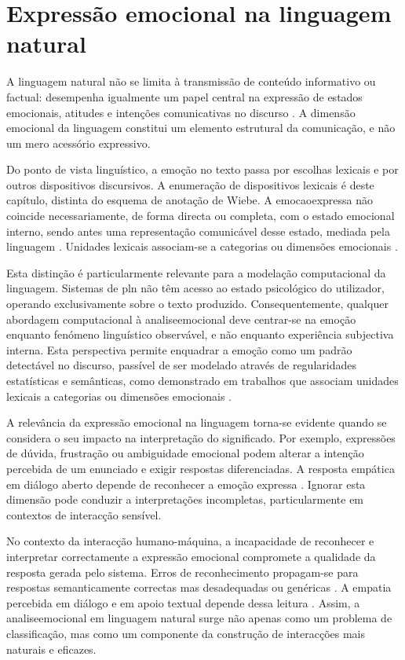 \section{Expressão emocional na linguagem natural}
\label{sec:expressao_emocional}

A linguagem natural não se limita à transmissão de conteúdo informativo ou factual: desempenha igualmente um papel central na expressão de estados emocionais, atitudes e intenções comunicativas no discurso \parencite{Wiebe2005Opinions}. A dimensão emocional da linguagem constitui um elemento estrutural da comunicação, e não um mero acessório expressivo.

Do ponto de vista linguístico, a emoção no texto passa por escolhas lexicais e por outros dispositivos discursivos. A enumeração de dispositivos lexicais é deste capítulo, distinta do esquema de anotação de Wiebe. A \gls{emocaoexpressa} não coincide necessariamente, de forma directa ou completa, com o estado emocional interno, sendo antes uma representação comunicável desse estado, mediada pela linguagem \parencite{Wiebe2005Opinions}. Unidades lexicais associam-se a categorias ou dimensões emocionais \parencite{MohammadTurney2013Lexicon}.

Esta distinção é particularmente relevante para a modelação computacional da linguagem. Sistemas de \gls{pln} não têm acesso ao estado psicológico do utilizador, operando exclusivamente sobre o texto produzido. Consequentemente, qualquer abordagem computacional à \gls{analiseemocional} deve centrar-se na emoção enquanto fenómeno linguístico observável, e não enquanto experiência subjectiva interna. Esta perspectiva permite enquadrar a emoção como um padrão detectável no discurso, passível de ser modelado através de regularidades estatísticas e semânticas, como demonstrado em trabalhos que associam unidades lexicais a categorias ou dimensões emocionais \parencite{MohammadTurney2013Lexicon}.

A relevância da expressão emocional na linguagem torna-se evidente quando se considera o seu impacto na interpretação do significado. Por exemplo, expressões de dúvida, frustração ou ambiguidade emocional podem alterar a intenção percebida de um enunciado e exigir respostas diferenciadas. A resposta empática em diálogo aberto depende de reconhecer a emoção expressa \parencite{Rashkin2019Empathy}. Ignorar esta dimensão pode conduzir a interpretações incompletas, particularmente em contextos de interacção sensível.

No contexto da interacção humano-máquina, a incapacidade de reconhecer e interpretar correctamente a expressão emocional compromete a qualidade da resposta gerada pelo sistema. Erros de reconhecimento propagam-se para respostas semanticamente correctas mas desadequadas ou genéricas \parencite{Huangfu2025NEC}. A empatia percebida em diálogo e em apoio textual depende dessa leitura \parencite{Rashkin2019Empathy, Sharma2020Empathy}. Assim, a \gls{analiseemocional} em linguagem natural surge não apenas como um problema de classificação, mas como um componente da construção de interacções mais naturais e eficazes.

